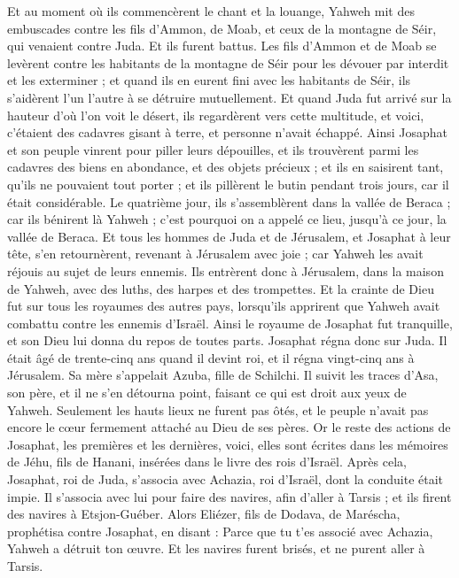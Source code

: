 \begin{multicols}{2}
Et au moment où ils commencèrent le chant et la louange, Yahweh mit des embuscades contre les fils d'Ammon, de Moab, et ceux de la montagne de Séir, qui venaient contre Juda. Et ils furent battus.
Les fils d'Ammon et de Moab se levèrent contre les habitants de la montagne de Séir pour les dévouer par interdit et les exterminer ; et quand ils en eurent fini avec les habitants de Séir, ils s'aidèrent l'un l'autre à se détruire mutuellement.
Et quand Juda fut arrivé sur la hauteur d'où l'on voit le désert, ils regardèrent vers cette multitude, et voici, c'étaient des cadavres gisant à terre, et personne n'avait échappé.
Ainsi Josaphat et son peuple vinrent pour piller leurs dépouilles, et ils trouvèrent parmi les cadavres des biens en abondance, et des objets précieux ; et ils en saisirent tant, qu'ils ne pouvaient tout porter ; et ils pillèrent le butin pendant trois jours, car il était considérable.
Le quatrième jour, ils s'assemblèrent dans la vallée de Beraca ; car ils bénirent là Yahweh ; c'est pourquoi on a appelé ce lieu, jusqu'à ce jour, la vallée de Beraca.
Et tous les hommes de Juda et de Jérusalem, et Josaphat à leur tête, s'en retournèrent, revenant à Jérusalem avec joie ; car Yahweh les avait réjouis au sujet de leurs ennemis. 
Ils entrèrent donc à Jérusalem, dans la maison de Yahweh, avec des luths, des harpes et des trompettes.
Et la crainte de Dieu fut sur tous les royaumes des autres pays, lorsqu'ils apprirent que Yahweh avait combattu contre les ennemis d'Israël.
Ainsi le royaume de Josaphat fut tranquille, et son Dieu lui donna du repos de toutes parts.
Josaphat régna donc sur Juda. Il était âgé de trente-cinq ans quand il devint roi, et il régna vingt-cinq ans à Jérusalem. Sa mère s'appelait Azuba, fille de Schilchi.
Il suivit les traces d'Asa, son père, et il ne s'en détourna point, faisant ce qui est droit aux yeux de Yahweh.
Seulement les hauts lieux ne furent pas ôtés, et le peuple n'avait pas encore le cœur fermement attaché au Dieu de ses pères.
Or le reste des actions de Josaphat, les premières et les dernières, voici, elles sont écrites dans les mémoires de Jéhu, fils de Hanani, insérées dans le livre des rois d'Israël.
Après cela, Josaphat, roi de Juda, s'associa avec Achazia, roi d'Israël, dont la conduite était impie.
Il s'associa avec lui pour faire des navires, afin d'aller à Tarsis ; et ils firent des navires à Etsjon-Guéber.
Alors Eliézer, fils de Dodava, de Maréscha, prophétisa contre Josaphat, en disant : Parce que tu t'es associé avec Achazia, Yahweh a détruit ton œuvre. Et les navires furent brisés, et ne purent aller à Tarsis.

\end{multicols}
